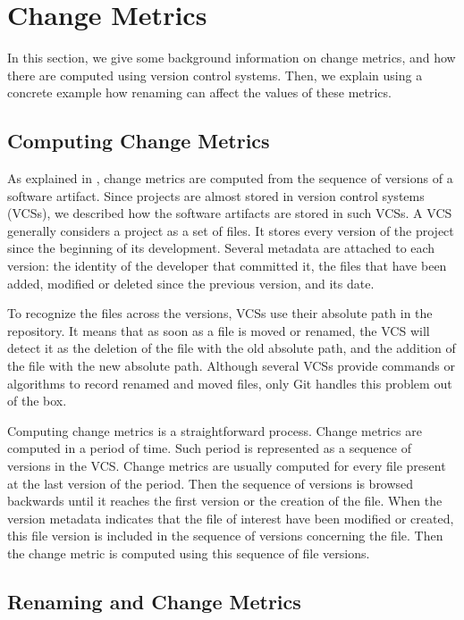 \section{Change Metrics}
\label{sec:changemetrics}

In this section, we give some background information on change metrics, and how there are computed using version control systems. Then, we explain using a concrete example how renaming can affect the values of these metrics.

\subsection{Computing Change Metrics}

As explained in , change metrics are computed from the sequence of versions of a software artifact. Since projects are almost stored in version control systems (VCSs), we described how the software artifacts are stored in such VCSs. A VCS generally considers a project as a set of files. It stores every version of the project since the beginning of its development. Several metadata are attached to each version: the identity of the developer that committed it, the files that have been added, modified or deleted since the previous version, and its date.

To recognize the files across the versions, VCSs use their absolute path in the repository. It means that as soon as a file is moved or renamed, the VCS will detect it as the deletion of the file with the old absolute path, and the addition of the file with the new absolute path. Although several VCSs provide commands or algorithms to record renamed and moved files, only Git handles this problem out of the box.

Computing change metrics is a straightforward process. Change metrics are computed in a period of time. Such period is represented as a sequence of versions in the VCS. Change metrics are usually computed for every file present at the last version of the period. Then the sequence of versions is browsed backwards until it reaches the first version or the creation of the file. When the version metadata indicates that the file of interest have been modified or created, this file version is included in the sequence of versions concerning the file. Then the change metric is computed using this sequence of file versions.

\subsection{Renaming and Change Metrics}

